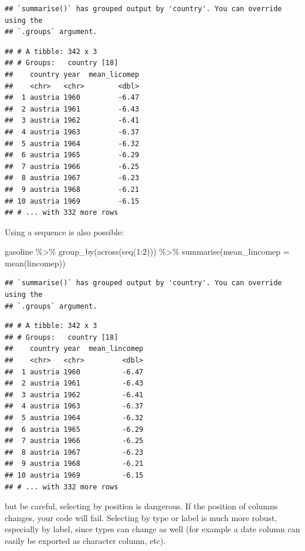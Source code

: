 \documentclass[
]{article}
\newenvironment{Shaded}{\begin{snugshade}}{\end{snugshade}}
\newcommand{\AttributeTok}[1]{\textcolor[rgb]{0.77,0.63,0.00}{#1}}
\newcommand{\DecValTok}[1]{\textcolor[rgb]{0.00,0.00,0.81}{#1}}
\newcommand{\FunctionTok}[1]{\textcolor[rgb]{0.00,0.00,0.00}{#1}}
\newcommand{\NormalTok}[1]{#1}
\newcommand{\SpecialCharTok}[1]{\textcolor[rgb]{0.00,0.00,0.00}{#1}}
\begin{document}
\begin{verbatim}
## `summarise()` has grouped output by 'country'. You can override using the
## `.groups` argument.
\end{verbatim}

\begin{verbatim}
## # A tibble: 342 x 3
## # Groups:   country [18]
##    country year  mean_licomep
##    <chr>   <chr>        <dbl>
##  1 austria 1960         -6.47
##  2 austria 1961         -6.43
##  3 austria 1962         -6.41
##  4 austria 1963         -6.37
##  5 austria 1964         -6.32
##  6 austria 1965         -6.29
##  7 austria 1966         -6.25
##  8 austria 1967         -6.23
##  9 austria 1968         -6.21
## 10 austria 1969         -6.15
## # ... with 332 more rows
\end{verbatim}

Using a sequence is also possible:

\begin{Shaded}
\begin{Highlighting}[]
\NormalTok{gasoline }\SpecialCharTok{\%\textgreater{}\%}
  \FunctionTok{group\_by}\NormalTok{(}\FunctionTok{across}\NormalTok{(}\FunctionTok{seq}\NormalTok{(}\DecValTok{1}\SpecialCharTok{:}\DecValTok{2}\NormalTok{))) }\SpecialCharTok{\%\textgreater{}\%}
  \FunctionTok{summarise}\NormalTok{(}\AttributeTok{mean\_lincomep =} \FunctionTok{mean}\NormalTok{(lincomep))}
\end{Highlighting}
\end{Shaded}

\begin{verbatim}
## `summarise()` has grouped output by 'country'. You can override using the
## `.groups` argument.
\end{verbatim}

\begin{verbatim}
## # A tibble: 342 x 3
## # Groups:   country [18]
##    country year  mean_lincomep
##    <chr>   <chr>         <dbl>
##  1 austria 1960          -6.47
##  2 austria 1961          -6.43
##  3 austria 1962          -6.41
##  4 austria 1963          -6.37
##  5 austria 1964          -6.32
##  6 austria 1965          -6.29
##  7 austria 1966          -6.25
##  8 austria 1967          -6.23
##  9 austria 1968          -6.21
## 10 austria 1969          -6.15
## # ... with 332 more rows
\end{verbatim}

but be careful, selecting by position is dangerous. If the position of columns changes, your code
will fail. Selecting by type or label is much more robust, especially by label, since types can
change as well (for example a date column can easily be exported as character column, etc).
\end{document}

